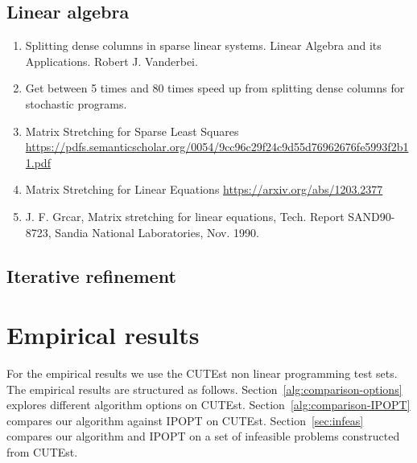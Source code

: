 \documentclass{article}
\begin{document}

%
\subsection{Linear algebra}\label{sec:linear-algebra}


\begin{enumerate}
\item Splitting dense columns in sparse linear systems. Linear Algebra and its Applications. Robert J. Vanderbei. \cite{vanderbei1991splitting}
\item \cite{lustig1991formulating} Get between 5 times and 80 times speed up from splitting dense columns for stochastic programs.
\item Matrix Stretching for Sparse Least Squares \url{https://pdfs.semanticscholar.org/0054/9cc96c29f24c9d55d76962676fe5993f2b11.pdf}
\item Matrix Stretching for Linear Equations \url{https://arxiv.org/abs/1203.2377}
\item J. F. Grcar, Matrix stretching for linear equations, Tech. Report SAND90-8723, Sandia
National Laboratories, Nov. 1990.
\end{enumerate}

\subsection{Iterative refinement}

\section{Empirical results}\label{sec:empirical-results}

For the empirical results we use the CUTEst non linear programming test sets. The empirical results are structured as follows. Section~\ref{alg:comparison-options} explores different algorithm options on CUTEst.  Section~\ref{alg:comparison-IPOPT} compares our algorithm against IPOPT on CUTEst. Section~\ref{sec:infeas} compares our algorithm and IPOPT on a set of infeasible problems constructed from CUTEst. %
\end{document}

